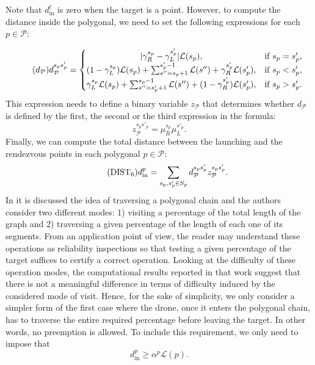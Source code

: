 \documentclass{itor}
\theoremstyle{definition}
\theoremstyle{remark}
\begin{document}
Note that $d_{\text{in}}^t$ is zero when the target is a point. However, to compute the distance inside the polygonal, we need to set the following expressions for each $p\in\mathcal P$:



\begin{equation}\tag{$d_{\mathcal P}$}\label{eq:dP}
d_{\mathcal P}^{s_ps'_p} = \left\{\begin{matrix}
|\gamma_R^{s_p} - \gamma_L^{s'_p}|\mathcal L(s_p), & \text{if } s_p = s'_p,\\
(1 - \gamma_L^{s_p})\mathcal L(s_p) + \sum_{s'' = s_p+1}^{s'_p-1}\mathcal L(s'') + \gamma_{R}^{s'_p}\mathcal L(s'_p), & \text{if } s_p < s'_p, \\
\gamma_L^{s_p}\mathcal L(s_p) + \sum_{s'' = s'_p+1}^{s_p-1}\mathcal L(s'') + (1-\gamma_{R}^{s'_p})\mathcal L(s'_p), & \text{if } s_p > s'_p.
\end{matrix}\right.
\end{equation}
This expression needs to define a binary variable $z_{\mathcal P}$ that determines whether $d_{\mathcal P}$ is defined by the first, the second or the third expression in the formula:
\begin{equation*}
z_{\mathcal P}^{s_ps'_p} = \mu_R^{s_p}\mu_L^{s'_p}.
\end{equation*}
Finally, we can compute the total distance between the launching and the rendezvous points in each polygonal $p\in\mathcal P$:
\begin{equation}\tag{DIST$_{6}$} \label{eq:d6}
    d_{\text{in}}^p = \sum_{s_p,s'_p\in S_p} d_{\mathcal P}^{s_ps'_p}z_{\mathcal P}^{s_ps'_p}.    
\end{equation}
\noindent
In \cite{art:Amorosi2021,Puerto2021} it is discussed the idea of traversing a polygonal chain and the authors consider two different modes: 1) visiting a percentage of the total length of the graph and 2) traversing a given percentage of the length of each one of its segments. From an application point of view, the reader may understand these operations as reliability inspections so that testing a given percentage of the target suffices to certify a correct operation. Looking at the difficulty of these operation modes, the computational results reported in that work suggest that there is not a meaningful difference in terms of difficulty induced by the considered mode of visit. Hence, for the sake of simplicity, we only consider a simpler form of the first case where the drone, once it enters the polygonal chain, has to traverse the entire required percentage before leaving the target. In other words, no preemption is allowed. To include this requirement, we only need to impose that
\begin{equation}\label{eq:alpha-p}\tag{$\alpha-\mathcal P$}
d_{\text{in}}^p \geq \alpha^p \mathcal{L}(p).
\end{equation}
\end{document}
